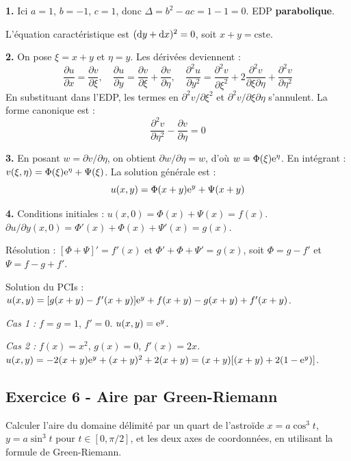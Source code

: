 \documentclass[12pt,a4paper]{article}
\begin{document}
\begin{boitecorrige}
\textbf{1.} Ici $a=1$, $b=-1$, $c=1$, donc $\Delta = b^2-ac = 1-1=0$. EDP \textbf{parabolique}.

L'équation caractéristique est $(\mathrm{d} y + \mathrm{d} x)^2 = 0$, soit $x+y = \text{cste}$.

\textbf{2.} On pose $\xi = x+y$ et $\eta = y$. Les dérivées deviennent :
\[
\frac{\partial u}{\partial x} = \frac{\partial v}{\partial\xi},\quad \frac{\partial u}{\partial y} = \frac{\partial v}{\partial\xi}+\frac{\partial v}{\partial\eta},\quad \frac{\partial^2 u}{\partial y^2} = \frac{\partial^2 v}{\partial\xi^2}+2\frac{\partial^2 v}{\partial\xi\partial\eta}+\frac{\partial^2 v}{\partial\eta^2}
\]
En substituant dans l'EDP, les termes en $\partial^2v/\partial\xi^2$ et $\partial^2v/\partial\xi\partial\eta$ s'annulent. La forme canonique est :
\[
\frac{\partial^2 v}{\partial\eta^2} - \frac{\partial v}{\partial\eta} = 0
\]

\textbf{3.} En posant $w=\partial v/\partial\eta$, on obtient $\partial w/\partial\eta = w$, d'où $w = \Phi(\xi)\mathrm{e}^\eta$. En intégrant : $v(\xi,\eta)=\Phi(\xi)\mathrm{e}^\eta+\Psi(\xi)$. La solution générale est :
\[
u(x,y) = \Phi(x+y)\mathrm{e}^y + \Psi(x+y)
\]

\textbf{4.} Conditions initiales :
$u(x,0) = \Phi(x)+\Psi(x) = f(x)$.
$\partial u/\partial y(x,0) = \Phi'(x)+\Phi(x)+\Psi'(x) = g(x)$.

Résolution : $[\Phi+\Psi]'=f'(x)$ et $\Phi'+\Phi+\Psi'=g(x)$, soit $\Phi = g-f'$ et $\Psi = f-g+f'$.

Solution du PCIs : $u(x,y) = [g(x+y)-f'(x+y)]\mathrm{e}^y + f(x+y)-g(x+y)+f'(x+y)$.

\textit{Cas 1 :} $f=g=1$, $f'=0$. $u(x,y) = \mathrm{e}^y$.

\textit{Cas 2 :} $f(x)=x^2$, $g(x)=0$, $f'(x)=2x$. $u(x,y) = -2(x+y)\mathrm{e}^y + (x+y)^2 + 2(x+y) = (x+y)[(x+y)+2(1-\mathrm{e}^y)]$.
\end{boitecorrige}

\subsection*{Exercice 6 - Aire par Green-Riemann \niveau{\moyen}}

\begin{boiteexercice}
Calculer l'aire du domaine délimité par un quart de l'astroïde $x=a\cos^3 t$, $y=a\sin^3 t$ pour $t\in[0,\pi/2]$, et les deux axes de coordonnées, en utilisant la formule de Green-Riemann.
\end{boiteexercice}
\end{document}
